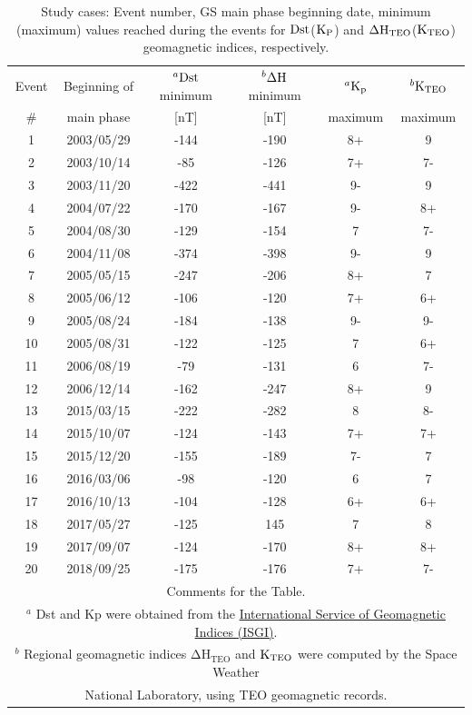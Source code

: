 \documentclass[a4paper,fleqn]{cas-dc}
\begin{document}
\begin{table}[h!]
\normalsize
\centering
    \caption{Study cases: Event number, GS main phase beginning date, minimum (maximum) values reached during the events for ${\rm Dst}$(${\rm K_P}$) and ${\rm \Delta H_{TEO}}$(${\rm K_{TEO}}$) geomagnetic indices, respectively.}
    \label{table1:GS_descp}
\begin{tabular}{cccccc}
\toprule
Event & Beginning of & $^a {\rm Dst}$ minimum
 & $^b{\rm \Delta H}$ minimum
 & $^a{\rm K_p}$ & $^b {\rm K_{TEO}}$ \\
\#    & main phase & [nT] & [nT] & maximum & maximum\\
\midrule
1 & 2003/05/29 & -144 & -190 & 8+ & 9 \\ 
2 & 2003/10/14 & -85 & -126 & 7+ & 7- \\ 
3 & 2003/11/20 & -422 & -441 & 9- & 9 \\ 
4 & 2004/07/22 & -170 & -167 & 9- & 8+ \\ 
5 & 2004/08/30 & -129 & -154 & 7 & 7- \\ 
6 & 2004/11/08 & -374 & -398 & 9- & 9 \\ 
7 & 2005/05/15 & -247 & -206 & 8+ & 7 \\ 
8 & 2005/06/12 & -106 & -120 & 7+ & 6+ \\ 
9 & 2005/08/24 & -184 & -138 & 9- & 9- \\ 
10 & 2005/08/31 & -122 & -125 & 7 & 6+ \\ 
11 & 2006/08/19 & -79 & -131 & 6 & 7- \\ 
12 & 2006/12/14 & -162 & -247 & 8+ & 9 \\ 
13 & 2015/03/15 & -222 & -282 & 8 & 8- \\ 
14 & 2015/10/07 & -124 & -143 & 7+ & 7+ \\ 
15 & 2015/12/20 & -155 & -189 & 7- & 7 \\ 
16 & 2016/03/06 & -98 & -120 & 6 & 7 \\ 
17 & 2016/10/13 & -104 & -128 & 6+ & 6+ \\ 
18 & 2017/05/27 & -125 & 145 & 7 & 8 \\ 
19 & 2017/09/07 & -124 & -170 & 8+ & 8+ \\ 
20 & 2018/09/25 & -175 & -176 & 7+ & 7- \\ 
\bottomrule
\multicolumn{6}{L}{Comments for the Table.} \\
\multicolumn{6}{L}{$^a$ Dst and Kp were obtained from the \href{http://isgi.unistra.fr/data_download.php}{International Service of Geomagnetic Indices (ISGI)}.}\\
\multicolumn{6}{L}{$^b$ Regional geomagnetic indices $\mathrm{\Delta H_{TEO}}$ and ${\rm K_{TEO}}$ were computed by the Space Weather} \\
\multicolumn{6}{L}{National Laboratory, using TEO geomagnetic records.}    \end{tabular}
\end{table}
\end{document}
